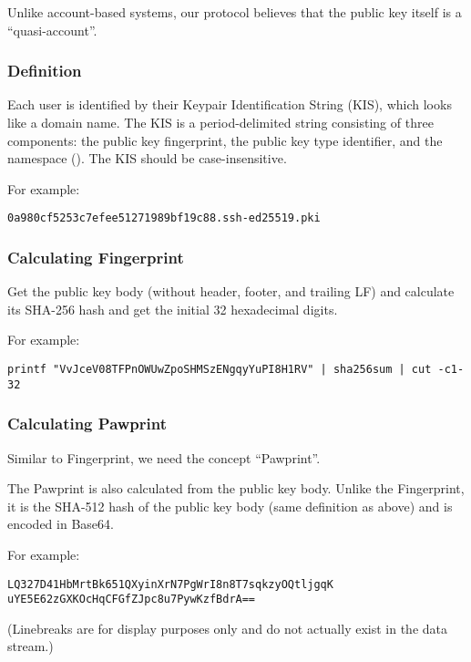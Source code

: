 \documentclass[a4paper,11pt]{article}
\begin{document}
Unlike account-based systems, our protocol believes that the public key itself is a ``quasi-account''.

\subsubsection{Definition}

Each user is identified by their Keypair Identification String (KIS), which looks like a domain name.
The KIS is a period-delimited string consisting of three components: the public key fingerprint,
the public key type identifier, and the namespace (). The KIS should be case-insensitive.

For example:

\begin{lstlisting}
0a980cf5253c7efee51271989bf19c88.ssh-ed25519.pki
\end{lstlisting}

\subsubsection{Calculating Fingerprint}

Get the public key body (without header, footer, and trailing LF) and calculate its SHA-256 hash and get the initial 32 hexadecimal digits.

For example:

\begin{lstlisting}
printf "VvJceV08TFPnOWUwZpoSHMSzENgqyYuPI8H1RV" | sha256sum | cut -c1-32
\end{lstlisting}

\subsubsection{Calculating Pawprint}

Similar to Fingerprint, we need the concept ``Pawprint''.

The Pawprint is also calculated from the public key body.
Unlike the Fingerprint, it is the SHA-512 hash of the public key body (same definition as above) and is encoded in Base64.


For example:

\begin{lstlisting}
LQ327D41HbMrtBk651QXyinXrN7PgWrI8n8T7sqkzyOQtljgqK
uYE5E62zGXKOcHqCFGfZJpc8u7PywKzfBdrA==
\end{lstlisting}

(Linebreaks are for display purposes only and do not actually exist in the data stream.)
\end{document}
